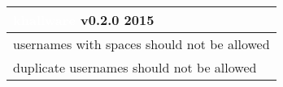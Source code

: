 \documentclass[notitlepage]{article}
\newcommand{\releasedate}{2015}
\begin{document}
\begin{center}
\begin{tabular}{ | l | }
\hline
\LARGE\cellcolor{myblue}\textcolor{white}{khallware} v0.2.0 \releasedate{} \\
\hline
usernames with spaces should not be allowed \\
\hline
duplicate usernames should not be allowed \\
\hline

\end{tabular}
\end{center}
\end{document}
